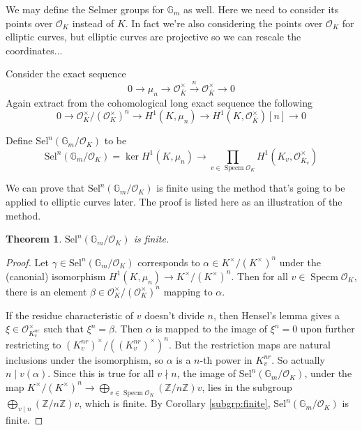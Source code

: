 \documentclass{article}
\newtheorem{thm}{Theorem}
\newcommand{\ord}{\mathcal{O}}
\newcommand{\mn}{\mu_{n}}
\newcommand{\kmkn}{K ^{\times} / (K ^{\times})^{n}}
\newcommand{\kvmkn}[1]{(#1) ^{\times} / ((#1) ^{\times})^{n}}
\DeclareMathOperator{\spec}{Specm}
\begin{document}
We may define the Selmer groups for $ \mathbb{G}_{m} $ as well.
Here we need to consider its points over $ \ord _{K} $ instead of $ K $.
In fact we're also considering the points over $ \ord _{K} $ for elliptic curves,
but elliptic curves are projective so we can rescale the coordinates...

Consider the exact sequence
$$ 0\to \mn\to \ord _{\overline{K}}^{\times}\xrightarrow{n} \ord _{\overline{K}}^{\times}\to 0 $$
Again extract from the cohomological long exact sequence the following
$$ 0\to \ord _{K}^{\times}/(\ord _{K}^{\times})^{n}
\to H ^{1}(K, \mn)\to H ^{1}(K, \ord _{\overline{K}}^{\times})[n]\to 0$$

Define $ \mathrm{Sel}^{n}(\mathbb{G}_{m}/\ord _{K}) $ to be 
$$ \mathrm{Sel}^{n}(\mathbb{G}_{m}/\ord _{K}) =
\ker H ^{1}(K, \mn)\to \prod _{v\in\spec \ord _{K}} H ^{1}(K _{v}, \ord _{\overline{K}_{v}}^{\times}) $$

We can prove that $ \mathrm{Sel}^{n}(\mathbb{G}_{m}/\ord _{K}) $ is finite using the method that's
going to be applied to elliptic curves later.
The proof is listed here as an illustration of the method.
\begin{thm}
$ \mathrm{Sel}^{n}(\mathbb{G}_{m}/\ord _{K}) $ is finite.
\end{thm}

\begin{proof}
Let $ \gamma\in \mathrm{Sel}^{n}(\mathbb{G}_{m}/\ord _{K}) $ corresponds to
$ \alpha\in \kmkn $ under the (canonial) isomorphism $ H ^{1}(K, \mn)\to \kmkn $.
Then for all $ v\in \spec\ord _{K} $, there is an element $ \beta\in
\ord _{K}^{\times}/(\ord _{K}^{\times})^{n}$ mapping to $ \alpha $.

If the residue characteristic of $ v $ doesn't divide $ n $,
then Hensel's lemma gives a $ \xi\in \ord _{K _{v}^{nr}}^{\times} $ such that
$ \xi ^{n} = \beta $.
Then $ \alpha $ is mapped to the image of $ \xi ^{n} = 0 $ upon further restricting to
$ \kvmkn{K _{v}^{nr}} $.
But the restriction maps are natural inclusions under the isomorphism,
so $ \alpha $ is a $ n $-th power in $ K _{v}^{nr} $.
So actually $ n\mid v (\alpha)$.
Since this is true for all $ v\nmid n $,
the image of $ \mathrm{Sel}^{n}(\mathbb{G}_{m}/\ord _{K}) $,
under the map $ \kmkn \to \bigoplus _{v\in \spec \ord _{K}} (\mathbb{Z}/n \mathbb{Z})v $,
lies in the subgroup
$ \bigoplus _{v\mid n} (\mathbb{Z}/n \mathbb{Z})v $, which is finite.
By Corollary \ref{subgrp:finite}, $ \mathrm{Sel}^{n}(\mathbb{G}_{m}/\ord _{K}) $ is finite. 
\end{proof}
\end{document}
